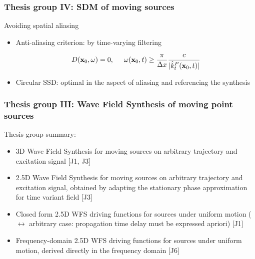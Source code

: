 \documentclass{beamer}
\begin{document}
\begin{frame}
\frametitle{Thesis group IV: SDM of moving sources}
\small
Avoiding spatial aliasing
\vspace{-3mm}
\begin{tcolorbox}
\begin{itemize}
\footnotesize
\item Anti-aliasing criterion: by time-varying filtering

\vspace{-2mm}		\begin{equation*}
		D(\mathbf{x}_0,\omega) = 0, \hspace{5mm} \omega(\mathbf{x}_0,t) \geq \frac{\pi}{\Delta x} \frac{c}{| \hat{k}^P_t(\mathbf{x}_0,t) |}
		\end{equation*}
\vspace{-5mm}
\item Circular SSD: optimal in the aspect of aliasing and referencing the synthesis
\end{itemize}
\end{tcolorbox}
\end{frame}

\begin{frame}
\frametitle{Thesis group III: Wave Field Synthesis of moving point sources}
Thesis group summary:
	\vspace{3mm}	
	\begin{itemize}
	\item 3D Wave Field Synthesis for moving sources on arbitrary trajectory and excitation signal [J1, J3]
	\vspace{3mm}	
	\item 2.5D Wave Field Synthesis for moving sources on arbitrary trajectory and excitation signal, obtained by adapting the stationary phase approximation for time variant field [J3]
	\vspace{3mm}	
	\item Closed form 2.5D WFS driving functions for sources under uniform motion ($\leftrightarrow$ arbitrary case: propagation time delay must be expressed apriori) [J1]
	\vspace{3mm}	
	\item Frequency-domain 2.5D WFS driving functions for sources under uniform motion, derived directly in the frequency domain [J6]
	\end{itemize}
\end{frame}
\end{document}
